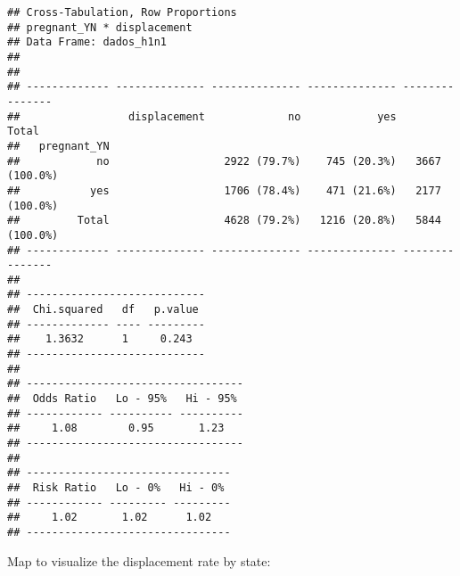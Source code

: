 \documentclass[
]{article}
\begin{document}
\begin{verbatim}
## Cross-Tabulation, Row Proportions  
## pregnant_YN * displacement  
## Data Frame: dados_h1n1  
## 
## 
## ------------- -------------- -------------- -------------- ---------------
##                 displacement             no            yes           Total
##   pregnant_YN                                                             
##            no                  2922 (79.7%)    745 (20.3%)   3667 (100.0%)
##           yes                  1706 (78.4%)    471 (21.6%)   2177 (100.0%)
##         Total                  4628 (79.2%)   1216 (20.8%)   5844 (100.0%)
## ------------- -------------- -------------- -------------- ---------------
## 
## ----------------------------
##  Chi.squared   df   p.value 
## ------------- ---- ---------
##    1.3632      1     0.243  
## ----------------------------
## 
## ----------------------------------
##  Odds Ratio   Lo - 95%   Hi - 95% 
## ------------ ---------- ----------
##     1.08        0.95       1.23   
## ----------------------------------
## 
## --------------------------------
##  Risk Ratio   Lo - 0%   Hi - 0% 
## ------------ --------- ---------
##     1.02       1.02      1.02   
## --------------------------------
\end{verbatim}

Map to visualize the displacement rate by state:
\end{document}
